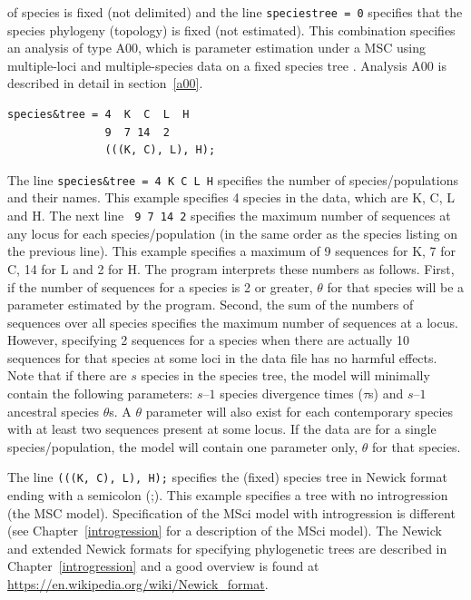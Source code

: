 \documentclass[a4paper]{book}
\numberwithin{equation}{section} \renewcommand{\baselinestretch}{0.55}
\begin{document}
of species is fixed (not delimited) and the line \texttt{speciestree =
  0} specifies that the species phylogeny (topology) is fixed (not
estimated). This combination specifies an analysis of type A00, which
is parameter estimation under a MSC using multiple-loci and
multiple-species data on a fixed species tree \citep{Rannala2003,
  Burgess2008}. Analysis A00 is described in detail in
section~\ref{a00}.
\begin{verbatim}
species&tree = 4  K  C  L  H
               9  7 14  2
               (((K, C), L), H);
\end{verbatim}
The line \texttt{species\&tree = 4 K C L H} specifies the number of
species/populations and their names.  This example specifies 4 species
in the data, which are K, C, L and H.  The next line \texttt{ 9 7 14
  2} specifies the maximum number of sequences at any locus for each
species/population (in the same order as the species listing on the
previous line).  This example specifies a maximum of 9 sequences for
K, 7 for C, 14 for L and 2 for H.  The program interprets these
numbers as follows.  First, if the number of sequences for a species
is 2 or greater, $\theta$ for that species will be a parameter
estimated by the program.  Second, the sum of the numbers of sequences
over all species specifies the maximum number of sequences at a locus.
However, specifying 2 sequences for a species when there are actually
10 sequences for that species at some loci in the data file has no
harmful effects.  Note that if there are $s$ species in the species
tree, the model will minimally contain the following parameters:
$s – 1$ species divergence times ($\tau$s) and $s – 1$ ancestral
species $\theta$s.  A $\theta$ parameter will also exist for each
contemporary species with at least two sequences present at some
locus. If the data are for a single species/population, the model will
contain one parameter only, $\theta$ for that species.

The line \texttt{(((K, C), L), H);} specifies the (fixed) species tree
in Newick format ending with a semicolon (;).  This example specifies
a tree with no introgression (the MSC model). Specification of the
MSci model with introgression is different (see
Chapter~\ref{introgression} for a description of the MSci model). The
Newick and extended Newick formats for specifying phylogenetic trees
are described in Chapter~\ref{introgression} and a good overview is
found at \url{https://en.wikipedia.org/wiki/Newick_format}.
\end{document}
